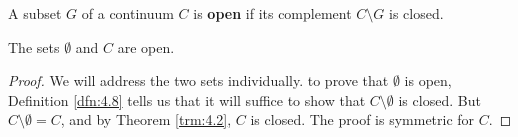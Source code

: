 \documentclass[../main.tex]{subfiles}
\begin{document}
\begin{definition}\label{dfn:4.8}
    A subset $G$ of a continuum $C$ is \textbf{open} if its complement $C\setminus G$ is closed.
\end{definition}

\begin{theorem}\label{trm:4.9}
    The sets $\emptyset$ and $C$ are open.
    \begin{proof}
        We will address the two sets individually. to prove that $\emptyset$ is open, Definition \ref{dfn:4.8} tells us that it will suffice to show that $C\setminus\emptyset$ is closed. But $C\setminus\emptyset=C$, and by Theorem \ref{trm:4.2}, $C$ is closed. The proof is symmetric for $C$.
    \end{proof}
\end{theorem}
\end{document}
